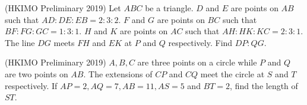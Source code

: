 \documentclass[12pt]{scrartcl}
\begin{document}
    \begin{soalbaru}
    (HKIMO Preliminary 2019) Let $ABC$ be a triangle. $D$ and $E$ are points on $AB$ such that $AD:DE:EB=2:3:2$. $F$ and $G$ are points on $BC$ such that $BF:FG:GC=1:3:1$. $H$ and $K$ are points on $AC$ such that $AH:HK:KC=2:3:1$. The line $DG$ meets $FH$ and $EK$ at $P$ and $Q$ respectively. Find $DP:QG$.
    \end{soalbaru}
    
    \begin{soalbaru}
    (HKIMO Preliminary 2019) $A, B, C$ are three points on a circle while $P$ and $Q$ are two points on $AB$. The extensions of $CP$ and $CQ$ meet the circle at $S$ and $T$ respectively. If $AP = 2, AQ = 7, AB = 11, AS = 5$ and $BT = 2$, find the length of $ST$.
    \end{soalbaru}
	
\end{document}
